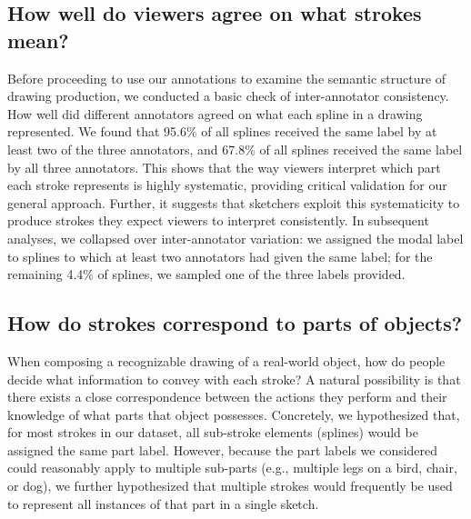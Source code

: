 \documentclass[10pt,letterpaper]{article}
\newcommand{\kushin}[1]{{\color{orange}{[kushin: #1]}}}
\begin{document}
\subsection{How well do viewers agree on what strokes mean?}

Before proceeding to use our annotations to examine the semantic structure of drawing production, we conducted a basic check of inter-annotator consistency.
How well did different annotators agreed on what each spline in a drawing represented. 
We found that 95.6\% of all splines received the same label by at least two of the three annotators, and 67.8\% of all splines received the same label by all three annotators. 
This shows that the way viewers interpret which part each stroke represents is highly systematic, providing critical validation for our general approach. 
Further, it suggests that sketchers exploit this systematicity to produce strokes they expect viewers to interpret consistently. 
In subsequent analyses, we collapsed over inter-annotator variation: we assigned the modal label to splines to which at least two annotators had given the same label; for the remaining 4.4\% of splines, we sampled one of the three labels provided.


\subsection{How do strokes correspond to parts of objects?}

When composing a recognizable drawing of a real-world object, how do people decide what information to convey with each stroke? 
A natural possibility is that there exists a close correspondence between the actions they perform and their knowledge of what parts that object possesses. %
Concretely, we hypothesized that, for most strokes in our dataset, all sub-stroke elements (splines) would be assigned the same part label. 
However, because the part labels we considered could reasonably apply to multiple sub-parts (e.g., multiple legs on a bird, chair, or dog), we further hypothesized that multiple strokes would frequently be used to represent all instances of that part in a single sketch.
\end{document}
